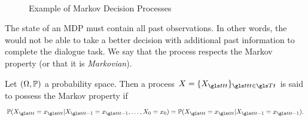 \begin{figure}
    \begin{center}
        \\
        \caption{Example of Markov Decision Processes}
        \label{fig:renonculacees}
    \end{center}
\end{figure}
%
The state of an \gls{MDP} must contain all past observations. In other words, the  would not be able to take a better decision with additional past information to complete the dialogue task. We say that the process respects the Markov property (or that it is \textit{Markovian}).
\begin{definition}
    Let $(\Omega,\mathbb{P})$  a probability space. Then a  process $X=\{X_{\indextransition}\}_{\indextransition\in\T}$ is said to possess the Markov property if
    \begin{equation}
        \mathbb{P}(X_{\indextransition}=x_{\indextransition}|X_{\indextransition-1} = x_{\indextransition-1},\dots,X_0=x_0)=\mathbb{P}(X_{\indextransition}=x_{\indextransition}| X_{\indextransition-1}=x_{\indextransition-1}).
    \end{equation}
\end{definition}
